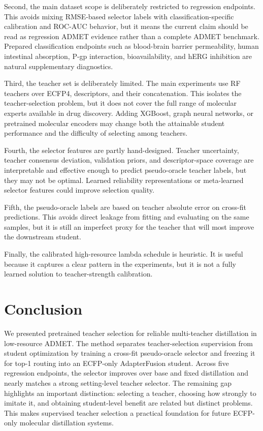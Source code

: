 \documentclass[11pt]{article}
\begin{document}
Second, the main dataset scope is deliberately restricted to regression
endpoints. This avoids mixing RMSE-based selector labels with
classification-specific calibration and ROC-AUC behavior, but it means the
current claim should be read as regression ADMET evidence rather than a complete
ADMET benchmark. Prepared classification endpoints such as blood-brain barrier
permeability, human intestinal absorption, P-gp interaction, bioavailability,
and hERG inhibition are natural supplementary diagnostics.

Third, the teacher set is deliberately limited. The main experiments use RF
teachers over ECFP4, descriptors, and their concatenation. This isolates the
teacher-selection problem, but it does not cover the full range of molecular
experts available in drug discovery. Adding XGBoost, graph neural networks, or
pretrained molecular encoders may change both the attainable student
performance and the difficulty of selecting among teachers.

Fourth, the selector features are partly hand-designed. Teacher uncertainty,
teacher consensus deviation, validation priors, and descriptor-space coverage
are interpretable and effective enough to predict pseudo-oracle teacher labels,
but they may not be optimal. Learned reliability representations or
meta-learned selector features could improve selection quality.

Fifth, the pseudo-oracle labels are based on teacher absolute error on
cross-fit predictions. This avoids direct leakage from fitting and evaluating
on the same samples, but it is still an imperfect proxy for the teacher that
will most improve the downstream student.

Finally, the calibrated high-resource lambda schedule is heuristic. It is
useful because it captures a clear pattern in the experiments, but it is not a
fully learned solution to teacher-strength calibration.

\section{Conclusion}

We presented pretrained teacher selection for reliable multi-teacher
distillation in low-resource ADMET. The method separates teacher-selection
supervision from student optimization by training a cross-fit pseudo-oracle
selector and freezing it for top-1 routing into an ECFP-only AdapterFusion
student. Across five regression endpoints, the selector improves over base and
fixed distillation and nearly matches a strong setting-level teacher selector.
The remaining gap highlights an important distinction: selecting a teacher,
choosing how strongly to imitate it, and obtaining student-level benefit are
related but distinct problems. This makes supervised teacher selection a
practical foundation for future ECFP-only molecular distillation systems.



\end{document}
